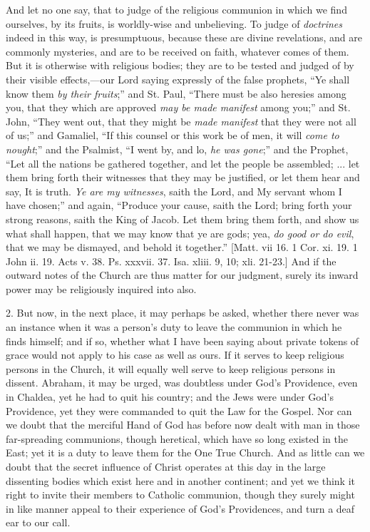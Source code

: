 And let no one say, that to judge of the religious communion in
which we find ourselves, by its fruits, is worldly-wise and
unbelieving. To judge of \emph{doctrines} indeed in this way, is
presumptuous, because these are divine revelations, and are commonly
mysteries, and are to be received on faith, whatever comes of them.
But it is otherwise with religious bodies; they are to be tested and
judged of by their visible effects,—our Lord saying expressly of the
false prophets, ``Ye shall know them \emph{by their fruits};''
and St. Paul, ``There must be also heresies among you, that they
which are approved \emph{may be made manifest} among you;'' and
St. John, ``They went out, that they might be \emph{made manifest}
that they were not all of us;'' and Gamaliel, ``If this
counsel or this work be of men, it will \emph{come to nought};''
and the Psalmist, ``I went by, and lo, \emph{he was gone};''
and the Prophet, ``Let all the nations be gathered together, and
let the people be assembled; ... let them bring forth their witnesses
that they may be justified, or let them hear and say, It is truth. \emph{Ye
are my witnesses}, saith the Lord, and My servant whom I have
chosen;'' and again, ``Produce your cause, saith the Lord;
bring forth your strong reasons, saith the King of Jacob. Let them
bring them forth, and show us what shall happen, that we may know that
ye are gods; yea, \emph{do good or do evil}, that we may be dismayed,
and behold it together.'' [Matt. vii 16. 1 Cor. xi. 19. 1 John ii.
19. Acts v. 38. Ps. xxxvii. 37. Isa. xliii. 9, 10; xli. 21-23.] And if
the outward notes of the Church are thus matter for our judgment,
surely its inward power may be religiously inquired into also.

2. But now, in the next place, it may perhaps be asked, whether
there never was an instance when it was a person's duty to leave the
communion in which he finds himself; and if so, whether what I have
been saying about private tokens of grace would not apply to his case
as well as ours. If it serves to keep religious persons in the Church,
it will equally well serve to keep religious persons in dissent.
Abraham, it may be urged, was doubtless under God's Providence, even
in Chaldea, yet he had to quit his country; and the Jews were under
God's Providence, yet they were commanded to quit the Law for the
Gospel. Nor can we doubt that the merciful Hand of God has before now
dealt with man in those far-spreading communions, though heretical,
which have so long existed in the East; yet it is a duty to leave them
for the One True Church. And as little can we doubt that the secret
influence of Christ operates at this day in the large dissenting
bodies which exist here and in another continent; and yet we think it
right to invite their members to Catholic communion, though they
surely might in like manner appeal to their experience of God's
Providences, and turn a deaf ear to our call.

